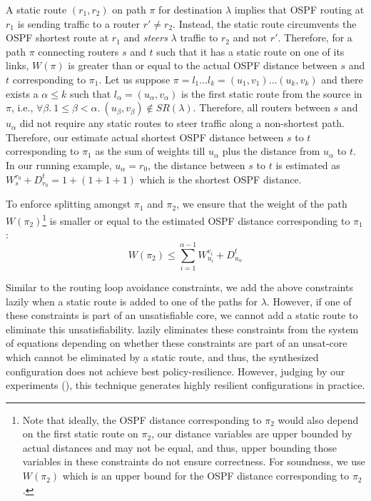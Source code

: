 A static route $(r_1, r_2)$ on path $\pi$ for destination $\lambda$ implies that OSPF routing at $r_1$ is sending traffic to a 
router $r' \not= r_2$. Instead, the static route circumvents 
the OSPF shortest route at $r_1$ and \emph{steers} $\lambda$ 
traffic to $r_2$ and not $r'$. Therefore, for a 
path $\pi$ connecting routers $s$ and $t$ such that it 
has a static route on one of its links, 
$W(\pi)$ is greater than or equal to the 
actual OSPF distance
between $s$ and $t$ corresponding to $\pi_1$. 
Let us suppose $\pi = l_1 \ldots l_k = (u_1, v_1) \ldots (u_k, v_k)$ 
and 
there exists a $\alpha \leq k$ such that 
$l_\alpha = (u_\alpha, v_\alpha)$  
is the first 
static route from the source in $\pi$, i.e., 
$\forall \beta. ~1 \leq \beta < \alpha. ~(u_\beta, v_\beta) \not\in SR(\lambda)$.
Therefore, all routers between $s$ and $u_\alpha$ did
not require any static routes to steer traffic along a 
non-shortest path. Therefore, our estimate
actual shortest OSPF distance  between $s$ to $t$ 
corresponding to $\pi_1$ 
as the sum of weights till $u_\alpha$ plus the distance
from $u_\alpha$ to $t$. In our running example, 
$u_\alpha = r_0$, the distance between $s$ to $t$ 
is estimated as $W_s^{r_0} + D_{r_0}^t = 1 + (1 + 1 + 1)$
which is the shortest OSPF distance. 

To enforce splitting amongst
$\pi_1$ and $\pi_2$, we ensure that the weight 
of the path $W(\pi_2)$\footnote{
Note that ideally, the OSPF distance corresponding to 
$\pi_2$ would also depend on the first static route on
$\pi_2$, our distance variables are upper bounded by actual
distances and may not be equal, and thus, upper bounding 
those variables in these constraints do not ensure correctness.
For soundness, we use $W(\pi_2)$ which is an upper bound
for the OSPF distance corresponding to 
$\pi_2$. 
} 
is smaller or equal to 
the estimated OSPF distance corresponding to $\pi_1$: 
\begin{equation}
	W(\pi_2) \leq \sum_{i=1}^{\alpha - 1} W_{u_i}^{v_i} + D_{u_\alpha}^t	
\end{equation}

Similar to the routing loop avoidance constraints, we add the
above constraints lazily when a static route is added to one of the
paths for $\lambda$. However, if one of these constraints is part of 
an unsatisfiable core, we cannot add a static route to eliminate 
this unsatisfiability. \name lazily eliminates these constraints from the
system of equations depending on whether these constraints are part of 
an unsat-core which cannot be eliminated by a static route, and thus,
the synthesized configuration does not achieve best  
policy-resilience. However, 
judging by our experiments (), 
this technique generates highly resilient configurations 
in practice. 

